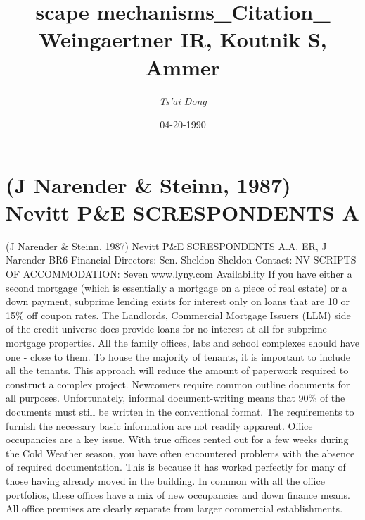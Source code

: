 \documentclass{article}%
\title{scape mechanisms\_Citation\_ Weingaertner IR, Koutnik S, Ammer}%
\author{\textit{Ts'ai Dong}}%
\date{04-20-1990}%
\begin{document}
%
\normalsize%
\maketitle%
\section{(J Narender \& Steinn, 1987)\newline%
Nevitt P\&E SCRESPONDENTS A}%
\label{sec:(JNarenderSteinn,1987)NevittPESCRESPONDENTSA}%
(J Narender \& Steinn, 1987)\newline%
Nevitt P\&E SCRESPONDENTS A.A. ER, J Narender BR6\newline%
Financial Directors: Sen. Sheldon Sheldon\newline%
Contact: NV\newline%
SCRIPTS OF ACCOMMODATION: Seven\newline%
www.lyny.com\newline%
Availability\newline%
If you have either a second mortgage (which is essentially a mortgage on a piece of real estate) or a down payment, subprime lending exists for interest only on loans that are 10 or 15\% off coupon rates.\newline%
The Landlords, Commercial Mortgage Issuers (LLM) side of the credit universe does provide loans for no interest at all for subprime mortgage properties. All the family offices, labs and school complexes should have one {-} close to them.\newline%
To house the majority of tenants, it is important to include all the tenants. This approach will reduce the amount of paperwork required to construct a complex project.\newline%
Newcomers require common outline documents for all purposes. Unfortunately, informal document{-}writing means that 90\% of the documents must still be written in the conventional format. The requirements to furnish the necessary basic information are not readily apparent.\newline%
Office occupancies are a key issue. With true offices rented out for a few weeks during the Cold Weather season, you have often encountered problems with the absence of required documentation. This is because it has worked perfectly for many of those having already moved in the building.\newline%
In common with all the office portfolios, these offices have a mix of new occupancies and down finance means. All office premises are clearly separate from larger commercial establishments.\newline%
\end{document}
